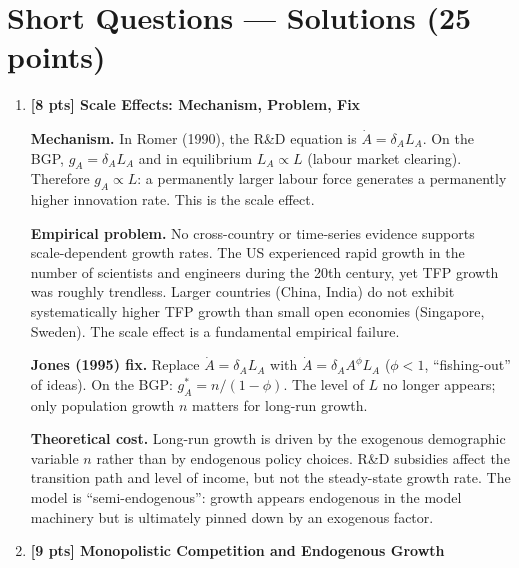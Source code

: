 \documentclass[a4paper,11pt]{article}
\begin{document}
\clearpage

\section*{Short Questions --- Solutions \hfill (25 points)}

\bigskip

\begin{enumerate}[label=\textbf{SQ\arabic*.},leftmargin=*]

\item \textbf{[8 pts] Scale Effects: Mechanism, Problem, Fix}

\begin{answerbox}
\textbf{Mechanism.} In Romer (1990), the R\&D equation is $\dot{A} = \delta_A L_A$. On the BGP, $g_A = \delta_A L_A$ and in equilibrium $L_A \propto L$ (labour market clearing). Therefore $g_A \propto L$: a permanently larger labour force generates a permanently higher innovation rate. This is the scale effect.

\textbf{Empirical problem.} No cross-country or time-series evidence supports scale-dependent growth rates. The US experienced rapid growth in the number of scientists and engineers during the 20th century, yet TFP growth was roughly trendless. Larger countries (China, India) do not exhibit systematically higher TFP growth than small open economies (Singapore, Sweden). The scale effect is a fundamental empirical failure.

\textbf{Jones (1995) fix.} Replace $\dot{A} = \delta_A L_A$ with $\dot{A} = \delta_A A^{\phi} L_A$ ($\phi < 1$, ``fishing-out'' of ideas). On the BGP: $g_A^* = n/(1-\phi)$. The level of $L$ no longer appears; only population growth $n$ matters for long-run growth.

\textbf{Theoretical cost.} Long-run growth is driven by the exogenous demographic variable $n$ rather than by endogenous policy choices. R\&D subsidies affect the transition path and level of income, but not the steady-state growth rate. The model is ``semi-endogenous'': growth appears endogenous in the model machinery but is ultimately pinned down by an exogenous factor.
\end{answerbox}

\bigskip

\item \textbf{[9 pts] Monopolistic Competition and Endogenous Growth}


\end{enumerate}
\end{document}
